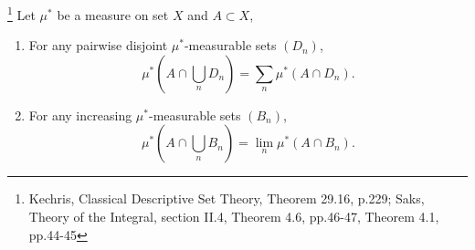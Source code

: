 \begin{lemma}  \label{L:meas_prop2}
  \footnote{
    Kechris, Classical Descriptive Set Theory, Theorem 29.16, p.229;
    Saks, Theory of the Integral, section II.4, Theorem 4.6, pp.46-47,
    Theorem 4.1, pp.44-45
  }
  Let $\mu^*$ be a measure on set $X$ and $A\subset X$,
  \begin{enumerate}
    \item[(1)] For any pairwise disjoint $\mu^*$-measurable sets $(D_n)$, 
      \[
        \mu^*(A\cap \bigcup_n D_n) = \sum_n \mu^*(A\cap D_n).
      \]
    \item[(2)] For any increasing $\mu^*$-measurable sets $(B_n)$, 
      \[
        \mu^*(A\cap \bigcup_n B_n) = \lim_n \mu^*(A\cap B_n).
      \]
  \end{enumerate}
\end{lemma}
